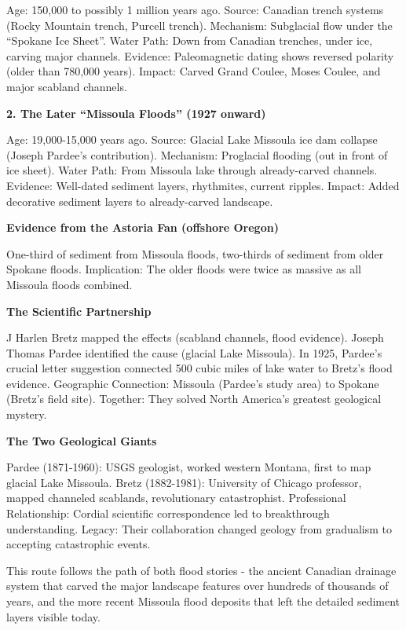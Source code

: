 \documentclass[
  11pt,
  letterpaper,
  DIV=10,
  numbers=noendperiod]{scrartcl}
\begin{document}
Age: 150,000 to possibly 1 million years ago. Source: Canadian trench
systems (Rocky Mountain trench, Purcell trench). Mechanism: Subglacial
flow under the ``Spokane Ice Sheet''. Water Path: Down from Canadian
trenches, under ice, carving major channels. Evidence: Paleomagnetic
dating shows reversed polarity (older than 780,000 years). Impact:
Carved Grand Coulee, Moses Coulee, and major scabland channels.

\textbf{2. The Later ``Missoula Floods'' (1927 onward)}

Age: 19,000-15,000 years ago. Source: Glacial Lake Missoula ice dam
collapse (Joseph Pardee's contribution). Mechanism: Proglacial flooding
(out in front of ice sheet). Water Path: From Missoula lake through
already-carved channels. Evidence: Well-dated sediment layers,
rhythmites, current ripples. Impact: Added decorative sediment layers to
already-carved landscape.

\textbf{Evidence from the Astoria Fan (offshore Oregon)}

One-third of sediment from Missoula floods, two-thirds of sediment from
older Spokane floods. Implication: The older floods were twice as
massive as all Missoula floods combined.

\textbf{The Scientific Partnership}

J Harlen Bretz mapped the effects (scabland channels, flood evidence).
Joseph Thomas Pardee identified the cause (glacial Lake Missoula). In
1925, Pardee's crucial letter suggestion connected 500 cubic miles of
lake water to Bretz's flood evidence. Geographic Connection: Missoula
(Pardee's study area) to Spokane (Bretz's field site). Together: They
solved North America's greatest geological mystery.

\textbf{The Two Geological Giants}

Pardee (1871-1960): USGS geologist, worked western Montana, first to map
glacial Lake Missoula. Bretz (1882-1981): University of Chicago
professor, mapped channeled scablands, revolutionary catastrophist.
Professional Relationship: Cordial scientific correspondence led to
breakthrough understanding. Legacy: Their collaboration changed geology
from gradualism to accepting catastrophic events.

This route follows the path of both flood stories - the ancient Canadian
drainage system that carved the major landscape features over hundreds
of thousands of years, and the more recent Missoula flood deposits that
left the detailed sediment layers visible today.
\end{document}
